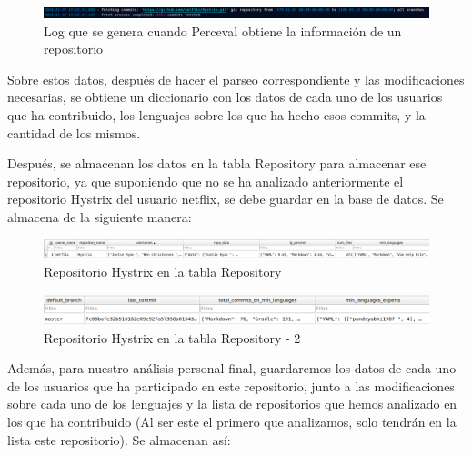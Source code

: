 \documentclass[a4paper, 12pt]{book}
\begin{document}
\begin{figure}[H]
  \centering
  \includegraphics[width=1\textwidth]{img/logperceval.png}
  \caption{Log que se genera cuando Perceval obtiene la información de un repositorio}
  \label{figura:logperceval}
\end{figure}

Sobre estos datos, después de hacer el parseo correspondiente y las modificaciones necesarias, se obtiene un diccionario con los datos de cada uno de los usuarios que ha contribuido, los lenguajes sobre los que ha hecho esos commits, y la cantidad de los mismos.

Después, se almacenan los datos en la tabla Repository para almacenar ese repositorio, ya que suponiendo que no se ha analizado anteriormente el repositorio Hystrix del usuario netflix, se debe guardar en la base de datos. Se almacena de la siguiente manera:

\begin{figure}[H]
  \centering
  \includegraphics[width=1\textwidth]{img/HYSTRIXBBDD1.png}
  \caption{Repositorio Hystrix en la tabla Repository}
  \label{figura:hystrixbbdd}
\end{figure}

\begin{figure}[H]
  \centering
  \includegraphics[width=1\textwidth]{img/HYSTRIXBBDD2.png}
  \caption{Repositorio Hystrix en la tabla Repository - 2} 
  \label{figura:hystrixbbdd2}
\end{figure}


Además, para nuestro análisis personal final, guardaremos los datos de cada uno de los usuarios que ha participado en este repositorio, junto a las modificaciones sobre cada uno de los lenguajes y la lista de repositorios que hemos analizado en los que ha contribuido (Al ser este el primero que analizamos, solo tendrán en la lista este repositorio). Se almacenan así:
\end{document}

